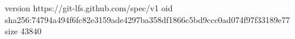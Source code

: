 version https://git-lfs.github.com/spec/v1
oid sha256:74794a494f6fc82e3159ade4297ba358df1866c5bd9ccc0ad074f97f33189e77
size 43840
